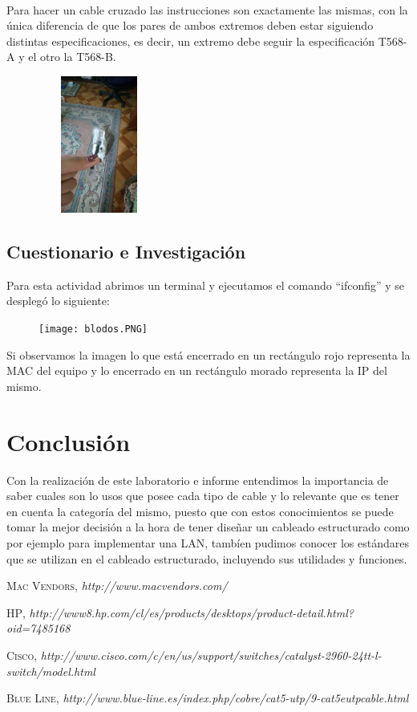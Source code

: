 \documentclass{udpreport}
\begin{document}
\begin{itemize}
    	\\Para hacer un cable cruzado las instrucciones son exactamente las mismas, con la única diferencia de que los pares de ambos extremos deben estar siguiendo distintas especificaciones, es decir, un extremo debe seguir la especificación T568-A y el otro la T568-B.
    	\begin{figure}[h]
		    \centering
    	\includegraphics[width=4cm, height=4.5cm]{cable.jpg}
    	\end{figure}
\end{itemize}
	\section{Cuestionario e Investigación}
		Para esta actividad abrimos un terminal y ejecutamos el comando ``ifconfig'' y se desplegó lo siguiente:\\
		\begin{figure}[h]
    		\centering
    	\texttt{[image: blodos.PNG]}
		\end{figure}
		Si observamos la imagen lo que está encerrado en un rectángulo rojo representa la MAC del equipo y lo encerrado en un
		rectángulo morado representa la IP del mismo.
\chapter{Conclusión}
    Con la realización de este laboratorio e informe entendimos la importancia de saber cuales son lo usos que posee cada tipo de cable y lo relevante que es tener en cuenta la categoría del mismo, puesto que con estos conocimientos se puede tomar la mejor decisión a la hora de tener diseñar un cableado estructurado como por ejemplo para implementar una LAN, tambíen pudimos conocer los estándares que se utilizan en el cableado estructurado, incluyendo sus utilidades y funciones.
\begin{thebibliography}{x}

 \textsc{Mac Vendors},
\textit{http://www.macvendors.com/}

 \textsc{HP},
\textit{http://www8.hp.com/cl/es/products/desktops/product-detail.html?oid=7485168}

 \textsc{Cisco},
\textit{http://www.cisco.com/c/en/us/support/switches/catalyst-2960-24tt-l-switch/model.html}

 \textsc{Blue Line},
\textit{http://www.blue-line.es/index.php/cobre/cat5-utp/9-cat5eutpcable.html}

\end{thebibliography}
\end{document}
